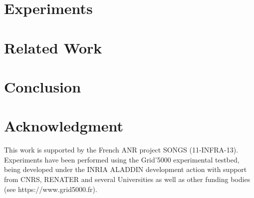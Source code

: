 \documentclass[conference]{IEEEtran}
\begin{document}
\section{Experiments}
\label{sec:experiments}
\section{Related Work}
\label{sec:related}
\section{Conclusion}
\label{sec:conclusion}





\section*{Acknowledgment}
This work is supported by the French ANR project SONGS (11-INFRA-13).
Experiments have been performed using the Grid'5000
experimental testbed, being developed under the INRIA ALADDIN development
 action with support from CNRS, RENATER and several Universities as well as
 other funding bodies (see https://www.grid5000.fr).



\end{document}
